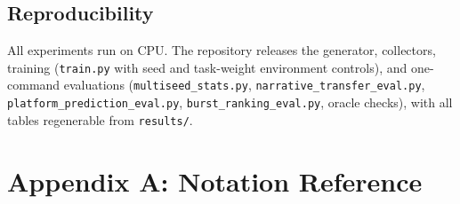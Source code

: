 \documentclass[11pt]{article}
\begin{document}
\subsection{Reproducibility}
All experiments run on CPU. The repository releases the generator, collectors,
training (\texttt{train.py} with seed and task-weight environment controls),
and one-command evaluations (\texttt{multiseed\_stats.py},
\texttt{narrative\_transfer\_eval.py}, \texttt{platform\_prediction\_eval.py},
\texttt{burst\_ranking\_eval.py}, oracle checks), with all tables regenerable
from \texttt{results/}.



\appendix

\section*{Appendix A: Notation Reference}
\end{document}
